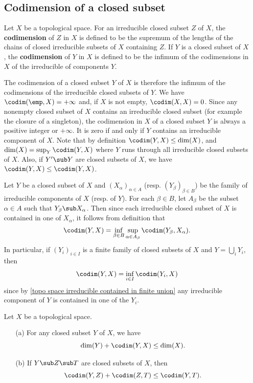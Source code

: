 \subsection{Codimension of a closed subset}
Let $X$ be a topological space. For an irreducible closed subset $Z$ of $X$, the \textbf{codimension} of $Z$ in $X$ is defined to be the supremum of the lengths of the chains of closed irreducible subsets of $X$ containing $Z$. If $Y$ is a closed subset of $X$, the \textbf{codimension} of $Y$ in $X$ is defined to be the infimum of the codimensions in $X$ of the irreducible of components $Y$.\par
The codimension of a closed subset $Y$ of $X$ is therefore the infimum of the codimensions of the irreducible closed subsets of $Y$. We have $\codim(\emp,X)=+\infty$ and, if $X$ is not empty, $\codim(X,X)=0$. Since any nonempty closed subset of $X$ contains an irreducible closed subset (for example the closure of a singleton), the codimension in $X$ of a closed subset $Y$ is always a positive integer or $+\infty$. It is zero if and only if $Y$ contains an irreducible component of $X$. Note that by definition $\codim(Y,X)\leq\dim(X)$, and $\dim(X)=\sup_Y\codim(Y,X)$ where $Y$ runs through all irreducible closed subsets of $X$. Also, if $Y'\sub Y$ are closed subsets of $X$, we have $\codim(Y,X)\leq\codim(Y,X)$.\par
Let $Y$ be a closed subset of $X$ and $(X_\alpha)_{\alpha\in A}$ (resp. $(Y_\beta)_{\beta\in B}$) be the family of irreducible components of $X$ (resp. of $Y$). For each $\beta\in B$, let $A_\beta$ be the subset $\alpha\in A$ such that $Y_\beta\sub X_\alpha$. Then since each irreducible closed subset of $X$ is contained in one of $X_\alpha$, it follows from definition that
\[\codim(Y,X)=\inf_{\beta\in B}\sup_{\alpha\in A_\beta}\codim(Y_\beta,X_\alpha).\]
In particular, if $(Y_i)_{i\in I}$ is a finite family of closed subsets of $X$ and $Y=\bigcup_iY_i$, then
\[\codim(Y,X)=\inf_{i\in I}\codim(Y_i,X)\]
since by \cref{topo space irreducible contained in finite union} any irreducible component of $Y$ is contained in one of the $Y_i$.
\begin{proposition}\label{topo space codim prop}
Let $X$ be a topological space.
\begin{itemize}
\item[(a)] For any closed subset $Y$ of $X$, we have
\[\dim(Y)+\codim(Y,X)\leq\dim(X).\]  
\item[(b)] If $Y\sub Z\sub T$ are closed subsets of $X$, then
\[\codim(Y,Z)+\codim(Z,T)\leq\codim(Y,T).\] 
\end{itemize}
\end{proposition}

